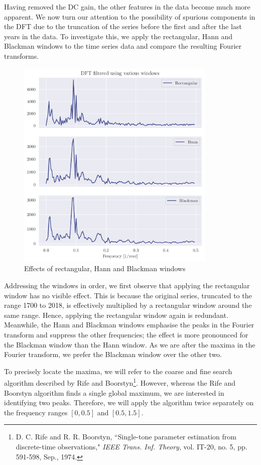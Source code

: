 \documentclass[a4paper, 11pt]{article}
\begin{document}
Having removed the DC gain, the other features in the data become much more
apparent. We now turn our attention to the possibility of spurious components
in the DFT due to the truncation of the series before the first and after the
last years in the data. To investigate this, we apply the rectangular, Hann and
Blackman windows to the time series data and compare the resulting Fourier
transforms.

\begin{figure}[ht!]
    \centering
    \includegraphics[width=0.85\textwidth]{images/q8_windowed.png}
    \caption{Effects of rectangular, Hann and Blackman windows}
    \label{fig:q8_windows}
\end{figure}

\newpage

Addressing the windows in order, we first observe that applying the rectangular
window has no visible effect. This is because the original series, truncated to
the range 1700 to 2018, is effectively multiplied by a rectangular window around
the same range. Hence, applying the rectangular window again is redundant.
Meanwhile, the Hann and Blackman windows emphasise the peaks in the Fourier
transform and suppress the other frequencies; the effect is more pronounced for
the Blackman window than the Hann window. As we are after the maxima in the
Fourier transform, we prefer the Blackman window over the other two.

To precisely locate the maxima, we will refer to the coarse and fine search
algorithm described by Rife and Boorstyn\footnote{D. C. Rife and R. R. Boorstyn,
``Single-tone parameter estimation from discrete-time observations,"
\textit{IEEE Trans. Inf. Theory}, vol. IT-20, no. 5, pp. 591-598, Sep., 1974.}.
However, whereas the Rife and Boorstyn algorithm finds a single global maximum,
we are interested in identifying two peaks. Therefore, we will apply the
algorithm twice separately on the frequency ranges $[0, 0.5]$ and $[0.5, 1.5]$.
\end{document}
